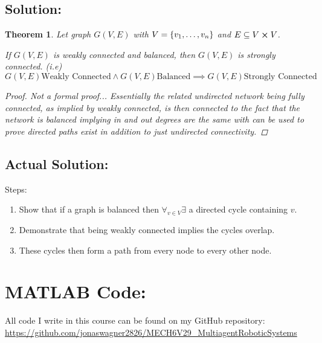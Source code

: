 \documentclass[]{article}
\numberwithin{equation}{section}
\newtheorem{theorem}{Theorem}
\begin{document}
% 
% 
% 
% 
% 


\subsection*{Solution:}
\begin{theorem}
    Let graph $G(V,E)$ with $V = \qty{v_1,\dots,v_n}$ and $E \subseteq V \cross V$.

    If $G(V,E)$ is weakly connected and balanced, then $G(V,E)$ is strongly connected.
    (i.e)\[
        G(V,E) \text{Weakly Connected} 
            \land G(V,E) \text{Balanced}
            \implies G(V,E) \text{Strongly Connected}
    \]
    \begin{proof}
        Not a formal proof...
        Essentially the related undirected network being fully connected, as implied by weakly connected, is then connected to the fact that the network is balanced implying in and out degrees are the same with can be used to prove directed paths exist in addition to just undirected connectivity.
    \end{proof}
\end{theorem}



\subsection*{\color{red} Actual Solution:}
Steps:
\begin{enumerate}
    \item Show that if a graph is balanced then $\forall_{v \in V} \exists$ a directed cycle containing $v$.
    \item Demonstrate that being weakly connected implies the cycles overlap.
    \item These cycles then form a path from every node to every other node.
\end{enumerate}



\newpage
\appendix
\section{MATLAB Code:}\label{apx:matlab}
All code I write in this course can be found on my GitHub repository:\\
\href{https://github.com/jonaswagner2826/MECH6V29_MultiagentRoboticSystems}{https://github.com/jonaswagner2826/MECH6V29\_MultiagentRoboticSystems}

% 

% 
% 
\end{document}
